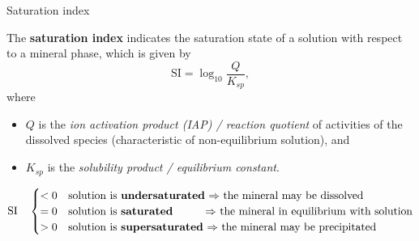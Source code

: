 %
%
\begin{frame}{Saturation index}

The \alert{\textbf{saturation index}} indicates the saturation state of
a solution with respect to a mineral phase, which is given by
%
\[
\boxed{ \mathrm{SI} = \log_{10} \frac{Q}{K_{sp}}},
\] 
where 
\begin{itemize}
\item $Q$ is the \emph{ion activation product (IAP) / reaction quotient} of activities of the dissolved species (characteristic of non-equilibrium solution), 
and 
\item $K_{sp}$ is the \emph{solubility product / equilibrium constant}. 
\end{itemize}
%
\[
\mathrm{SI} \quad \begin{cases}
< 0& \mbox{solution is \textbf{undersaturated} $\Rightarrow$ the mineral may be dissolved }\\
= 0& \mbox{solution is \textbf{saturated} \qquad \; $\Rightarrow$ the mineral in equilibrium with solution}\\
> 0 & \mbox{solution is \textbf{supersaturated} $\Rightarrow$ the mineral may be precipitated}
\end{cases}
\]
%

\end{frame}
%
%

